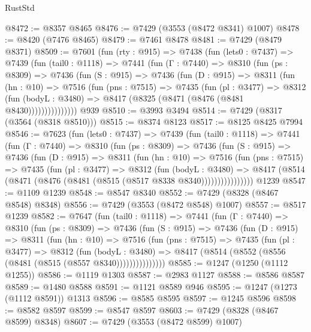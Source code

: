 \begin{lexlean}{RustStd}
\begin{coremodule}
@8472 := @8357 @8465
@8476 := @7429 (@3553 (@8472 @8341) @1007)
@8478 := @8420 (@7476 @8465)
@8479 := @7461 @8478
@8481 := @7429 (@8479 @8371)
@8509 := @7601
    (fun (rty : @915) =>
    @7438
      (fun (lets0 : @7437) =>
      @7439
        (fun (tail0 : @1118) =>
        @7441
          (fun (Γ : @7440) =>
          @8310
            (fun (ps : @8309) =>
            @7436
              (fun (S : @915) =>
              @7436
                (fun (D : @915) =>
                @8311
                  (fun (hn : @10) =>
                  @7516
                    (fun (pns : @7515) =>
                    @7435
                      (fun (pl : @3477) =>
                      @8312
                        (fun (bodyL : @3480) =>
                        @8417 (@8325 (@8471 (@8476 (@8481 @8430)))))))))))))))
    @939
@8510 := @3993 @3494
@8514 := @7429 (@8317 (@3564 (@8318 @8510)))
@8515 := @8374 @8123
@8517 := @8125 @8425 @7994
@8546 := @7623
    (fun (lets0 : @7437) =>
    @7439
      (fun (tail0 : @1118) =>
      @7441
        (fun (Γ : @7440) =>
        @8310
          (fun (ps : @8309) =>
          @7436
            (fun (S : @915) =>
            @7436
              (fun (D : @915) =>
              @8311
                (fun (hn : @10) =>
                @7516
                  (fun (pns : @7515) =>
                  @7435
                    (fun (pl : @3477) =>
                    @8312
                      (fun (bodyL : @3480) =>
                      @8417 (@8514 (@8471 (@8476 (@8481 (@8515 (@8517 @8338 @8340))))))))))))))))
    @1239
@8547 := @1109 @1239
@8548 := @8547 @8340
@8552 := @7429 (@8328 (@8467 @8548) @8348)
@8556 := @7429 (@3553 (@8472 @8548) @1007)
@8557 := @8517 @1239
@8582 := @7647
    (fun (tail0 : @1118) =>
    @7441
      (fun (Γ : @7440) =>
      @8310
        (fun (ps : @8309) =>
        @7436
          (fun (S : @915) =>
          @7436
            (fun (D : @915) =>
            @8311
              (fun (hn : @10) =>
              @7516
                (fun (pns : @7515) =>
                @7435
                  (fun (pl : @3477) =>
                  @8312
                    (fun (bodyL : @3480) =>
                    @8417 (@8514 (@8552 (@8556 (@8481 (@8515 (@8557 @8340)))))))))))))))
@8585 := @1247 (@1250 (@1112 @1255))
@8586 := @1119 @1303
@8587 := @2983 @1127
@8588 := @8586 @8587
@8589 := @1480 @8588
@8591 := @1121 @8589 @946
@8595 := @1247 (@1273 (@1112 @8591)) @1313
@8596 := @8585 @8595
@8597 := @1245 @8596
@8598 := @8582 @8597
@8599 := @8547 @8597
@8603 := @7429 (@8328 (@8467 @8599) @8348)
@8607 := @7429 (@3553 (@8472 @8599) @1007)

\end{coremodule}
\end{lexlean}

